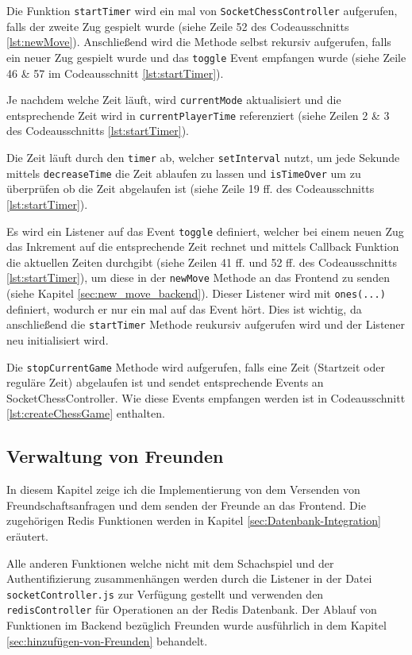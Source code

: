 Die Funktion \verb|startTimer| wird ein mal von \verb|SocketChessController| aufgerufen, falls der zweite Zug gespielt wurde (siehe Zeile 52 des Codeausschnitts \ref{lst:newMove}). Anschließend wird die Methode selbst rekursiv aufgerufen, falls ein neuer Zug gespielt wurde und das \verb|toggle| Event empfangen wurde (siehe Zeile 46 \& 57 im Codeausschnitt \ref{lst:startTimer}).

Je nachdem welche Zeit läuft, wird \verb|currentMode| aktualisiert und die entsprechende Zeit wird in \verb|currentPlayerTime| referenziert (siehe Zeilen 2 \& 3 des Codeausschnitts \ref{lst:startTimer}).

Die Zeit läuft durch den \verb|timer| ab, welcher \verb|setInterval| nutzt, um jede Sekunde mittels \verb|decreaseTime| die Zeit ablaufen zu lassen und \verb|isTimeOver| um zu überprüfen ob die Zeit abgelaufen ist (siehe Zeile 19 ff. des Codeausschnitts \ref{lst:startTimer}).

Es wird ein Listener auf das Event \verb|toggle| definiert, welcher bei einem neuen Zug das Inkrement auf die entsprechende Zeit rechnet und mittels Callback Funktion die aktuellen Zeiten durchgibt (siehe Zeilen 41 ff. und 52 ff. des Codeausschnitts \ref{lst:startTimer}), um diese in der \verb|newMove| Methode an das Frontend zu senden (siehe Kapitel \ref{sec:new_move_backend}). Dieser Listener wird mit \verb|ones(...)| definiert, wodurch er nur ein mal auf das Event hört. Dies ist wichtig, da anschließend die \verb|startTimer| Methode reukursiv aufgerufen wird und der Listener neu initialisiert wird.

Die \verb|stopCurrentGame| Methode wird aufgerufen, falls eine Zeit (Startzeit oder reguläre Zeit) abgelaufen ist und sendet entsprechende Events an SocketChessController. Wie diese Events empfangen werden ist in Codeausschnitt \ref{lst:createChessGame} enthalten.


\subsection{Verwaltung von Freunden}
\label{sec:Freunde-impl}
In diesem Kapitel zeige ich die Implementierung von dem Versenden von Freundschaftsanfragen und dem senden der Freunde an das Frontend. Die zugehörigen Redis Funktionen werden in Kapitel \ref{sec:Datenbank-Integration} eräutert.

Alle anderen Funktionen welche nicht mit dem Schachspiel und der Authentifizierung zusammenhängen werden durch die Listener in der Datei \verb|socketController.js| zur Verfügung gestellt und verwenden den \verb|redisController| für Operationen an der Redis Datenbank. Der Ablauf von Funktionen im Backend bezüglich Freunden wurde ausführlich in dem Kapitel \ref{sec:hinzufügen-von-Freunden} behandelt.

